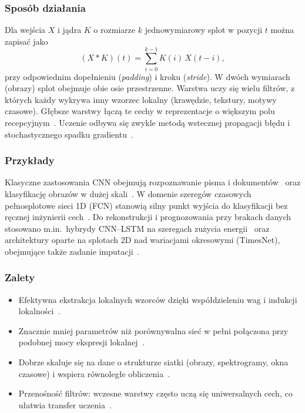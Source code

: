 \subsubsection{Sposób działania}
Dla wejścia $X$ i jądra $K$ o rozmiarze $k$ jednowymiarowy splot w pozycji $t$
można zapisać jako
\begin{equation}
  (X * K)(t) = \sum_{i=0}^{k-1} K(i)\, X(t-i),
  \label{eq:conv1d}
\end{equation}
przy odpowiednim dopełnieniu (\emph{padding}) i kroku (\emph{stride}).
W dwóch wymiarach (obrazy) splot obejmuje obie osie przestrzenne.
Warstwa uczy się wielu filtrów, z których każdy wykrywa inny wzorzec lokalny
(krawędzie, tekstury, motywy czasowe). Głębsze warstwy łączą te cechy w
reprezentacje o większym polu recepcyjnym~\citep{lecun2015deep,goodfellow2016deep}.
Uczenie odbywa się zwykle metodą wstecznej propagacji błędu i stochastycznego
spadku gradientu~\citep{lecun1998gradient}.

\subsubsection{Przykłady}
Klasyczne zastosowania CNN obejmują rozpoznawanie pisma i dokumentów~\citep{lecun1998gradient}
oraz klasyfikację obrazów w dużej skali~\citep{krizhevsky2012imagenet}.
W domenie szeregów czasowych pełnosplotowe sieci 1D (FCN) stanowią silny punkt
wyjścia do klasyfikacji bez ręcznej inżynierii cech~\citep{wang2017time}.
Do rekonstrukcji i prognozowania przy brakach danych stosowano m.in.\ hybrydy
CNN--LSTM na szeregach zużycia energii~\citep{hussain2022cnnlstm}
oraz architektury oparte na splotach 2D nad wariacjami okresowymi
(TimesNet), obejmujące także zadanie imputacji~\citep{wu2023timesnet}.

\subsubsection{Zalety}
\begin{itemize}
  \item Efektywna ekstrakcja lokalnych wzorców dzięki współdzieleniu wag
        i indukcji lokalności~\citep{lecun2015deep,goodfellow2016deep}.
  \item Znacznie mniej parametrów niż porównywalna sieć w pełni połączona
        przy podobnej mocy ekspresji lokalnej~\citep{lecun1998gradient}.
  \item Dobrze skaluje się na dane o strukturze siatki (obrazy, spektrogramy,
        okna czasowe) i wspiera równoległe obliczenia~\citep{krizhevsky2012imagenet}.
  \item Przenośność filtrów: wczesne warstwy często uczą się uniwersalnych cech,
        co ułatwia transfer uczenia~\citep{yosinski2014transferable}.
\end{itemize}

